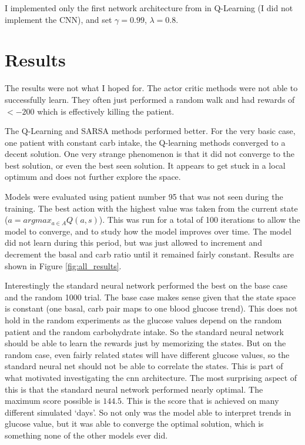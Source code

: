 \documentclass[11pt]{article}
\begin{document}
I implemented only the first network architecture from in Q-Learning (I did not implement the CNN), and set $\gamma = 0.99$, $\lambda = 0.8$.

\section{Results}
The results were not what I hoped for.
The actor critic methods were not able to successfully learn. 
They often just performed a random walk and had rewards of $<-200$ which is effectively killing the patient.

The Q-Learning and SARSA methods performed better.
For the very basic case, one patient with constant carb intake, the Q-learning methods converged to a decent solution.
One very strange phenomenon is that it did not converge to the best solution, or even the best seen solution.
It appears to get stuck in a local optimum and does not further explore the space. 

Models were evaluated using patient number 95 that was not seen during the training. 
The best action with the highest value was taken from the current state ($a = argmax_{a \in A} Q(a, s)$).
This was run for a total of 100 iterations to allow the model to converge, and to study how the model improves over time.
The model did not learn during this period, but was just allowed to increment and decrement the basal and carb ratio until it remained fairly constant.
Results are shown in Figure \ref{fig:all_results}.

Interestingly the standard neural network performed the best on the base case and the random 1000 trial.
The base case makes sense given that the state space is constant (one basal, carb pair maps to one blood glucose trend).
This does not hold in the random experiments as the glucose values depend on the random patient and the random carbohydrate intake.
So the standard neural network should be able to learn the rewards just by memorizing the states.
But on the random case, even fairly related states will have different glucose values,
so the standard neural net should not be able to correlate the states. 
This is part of what motivated investigating the cnn architecture. 
The most surprising aspect of this is that the standard neural network performed nearly optimal.
The maximum score possible is $144.5$. 
This is the score that is achieved on many different simulated `days'. 
So not only was the model able to interpret trends in glucose value, but it was able to converge the optimal solution,
which is something none of the other models ever did.
\end{document}
